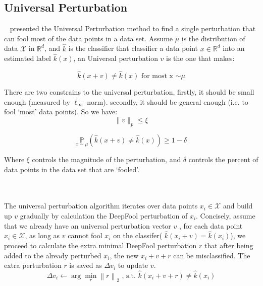 \documentclass{article}
\begin{document}
\subsection{Universal Perturbation}

~\cite{Moosavi-Dezfooli_2017_CVPR} presented the Universal Perturbation method to find a single perturbation that can fool most of the data points in a data set. Assume $\mu$ is the distribution of data $\mathcal{X}$ in $\mathbb{R}^{d}$, and $\hat{k}$ is the classifier that classifier a data point $x \in \mathbb{R}^{d}$ into an estimated label $\hat{k}(x)$, an Universal perturbation $v$ is the one that makes:

\begin{equation*}
\hat{k}(x+v) \neq \hat{k}(x) \mbox{ for most x $\sim \mu$}
\end{equation*}

\noindent There are two constrains to the universal perturbation, firstly, it should be small enough (measured by $\ell_{ \infty}$ norm). secondly, it should be general enough (i.e. to fool ‘most’ data points). So we have:
\begin{equation*}
\|v\|_{p} \leq \xi
\end{equation*}

\begin{equation*}
\underset{x \sim \mu}{\mathbb{P}}(\hat{k}(x+v) \neq \hat{k}(x)) \geq 1-\delta
\end{equation*}
    

\noindent Where $\xi$ controls the magnitude of the perturbation, and $\delta$ controls the percent of data points in the data set that are ‘fooled’.

\\ \hspace*{\fill} \\\noindent The universal perturbation algorithm iterates over data points $x_i  \in \mathcal{X}$ and build up $v$ gradually by calculation the DeepFool perturbation of $x_i $. Concisely, assume that we already have an universal perturbation vector $v$ , for each data point $x_i  \in \mathcal{X}$, as long as $v$ cannot fool $x_i $ on the classifer( $\hat{k}\left(x_{i}+v\right)=\hat{k}\left(x_{i}\right)$), 
	we proceed to calculate the extra minimal DeepFool perturbation $r$ that after being added to the already perturbed $ x_{i} $, the new $ x_{i}+v +r$ can be misclassified. The extra perturbation $r$ is saved as $\Delta v_{i}$ to update $v$.
	\begin{equation*}
	  \Delta v_{i} \leftarrow \arg \min _{r}\left\|r\right\|_{2}  \mbox{  ,  s.t. $\hat{k}\left(x_{i}+v+r\right) \neq \hat{k}\left(x_{i}\right)$}
	\end{equation*}
\end{document}
